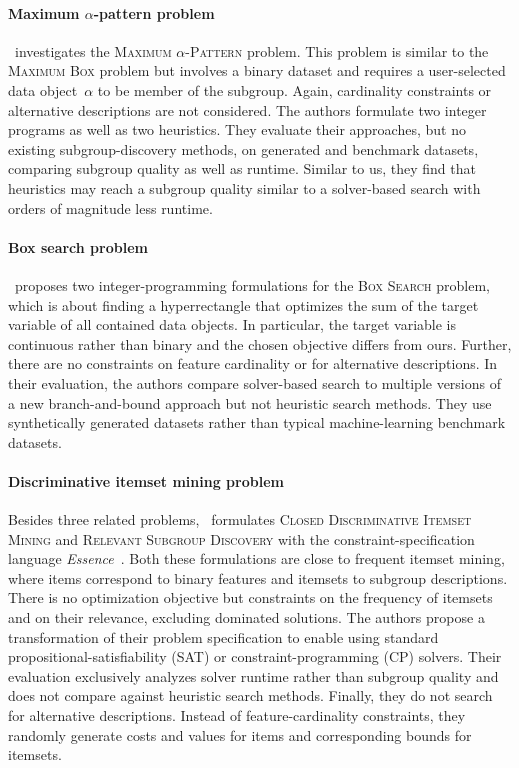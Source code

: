 \documentclass{article}
\theoremstyle{definition}
\begin{document}
\paragraph{Maximum $\alpha$-pattern problem}

\cite{bonates2008maximum}~investigates the \textsc{Maximum $\alpha$-Pattern} problem.
This problem is similar to the \textsc{Maximum Box} problem but involves a binary dataset and requires a user-selected data object~$\alpha$ to be member of the subgroup.
Again, cardinality constraints or alternative descriptions are not considered.
The authors formulate two integer programs as well as two heuristics.
They evaluate their approaches, but no existing subgroup-discovery methods, on generated and benchmark datasets, comparing subgroup quality as well as runtime.
Similar to us, they find that heuristics  may reach a subgroup quality similar to a solver-based search with orders of magnitude less runtime.

\paragraph{Box search problem}

\cite{louveaux2014combinatorial}~proposes two integer-programming formulations for the \textsc{Box Search} problem, which is about finding a hyperrectangle that optimizes the sum of the target variable of all contained data objects.
In particular, the target variable is continuous rather than binary and the chosen objective differs from ours.
Further, there are no constraints on feature cardinality or for alternative descriptions.
In their evaluation, the authors compare solver-based search to multiple versions of a new branch-and-bound approach but not heuristic search methods.
They use synthetically generated datasets rather than typical machine-learning benchmark datasets.

\paragraph{Discriminative itemset mining problem}

Besides three related problems, \cite{koccak2020exploiting}~formulates \textsc{Closed Discriminative Itemset Mining} and \textsc{Relevant Subgroup Discovery} with the constraint-specification language \emph{Essence}~\cite{frisch2008ssence}.
Both these formulations are close to frequent itemset mining, where items correspond to binary features and itemsets to subgroup descriptions.
There is no optimization objective but constraints on the frequency of itemsets and on their relevance, excluding dominated solutions.
The authors propose a transformation of their problem specification to enable using standard propositional-satisfiability (SAT) or constraint-programming (CP) solvers.
Their evaluation exclusively analyzes solver runtime rather than subgroup quality and does not compare against heuristic search methods.
Finally, they do not search for alternative descriptions.
Instead of feature-cardinality constraints, they randomly generate costs and values for items and corresponding bounds for itemsets.
\end{document}
